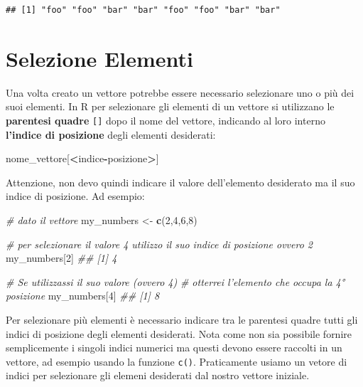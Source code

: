\documentclass[
]{book}
\newenvironment{Shaded}{\begin{snugshade}}{\end{snugshade}}
\newcommand{\CommentTok}[1]{\textcolor[rgb]{0.56,0.35,0.01}{\textit{#1}}}
\newcommand{\DecValTok}[1]{\textcolor[rgb]{0.00,0.00,0.81}{#1}}
\newcommand{\KeywordTok}[1]{\textcolor[rgb]{0.13,0.29,0.53}{\textbf{#1}}}
\newcommand{\NormalTok}[1]{#1}
\newcommand{\OperatorTok}[1]{\textcolor[rgb]{0.81,0.36,0.00}{\textbf{#1}}}
\newcommand{\StringTok}[1]{\textcolor[rgb]{0.31,0.60,0.02}{#1}}
\begin{document}
\begin{verbatim}
## [1] "foo" "foo" "bar" "bar" "foo" "foo" "bar" "bar"
\end{verbatim}

\hypertarget{selezione-elementi}{%
\section{Selezione Elementi}\label{selezione-elementi}}

Una volta creato un vettore potrebbe essere necessario selezionare uno o più dei suoi elementi. In R per selezionare gli elementi di un vettore si utilizzano le \textbf{parentesi quadre} \texttt{{[}{]}} dopo il nome del vettore, indicando al loro interno \textbf{l'indice di posizione} degli elementi desiderati:

\begin{Shaded}
\begin{Highlighting}[]
\NormalTok{nome_vettore[}\OperatorTok{<}\NormalTok{indice}\OperatorTok{-}\NormalTok{posizione}\OperatorTok{>}\NormalTok{]}
\end{Highlighting}
\end{Shaded}

Attenzione, non devo quindi indicare il valore dell'elemento desiderato ma il suo indice di posizione. Ad esempio:

\begin{Shaded}
\begin{Highlighting}[]
\CommentTok{# dato il vettore}
\NormalTok{my_numbers <-}\StringTok{ }\KeywordTok{c}\NormalTok{(}\DecValTok{2}\NormalTok{,}\DecValTok{4}\NormalTok{,}\DecValTok{6}\NormalTok{,}\DecValTok{8}\NormalTok{)}

\CommentTok{# per selezionare il valore 4 utilizzo il suo indice di posizione ovvero 2}
\NormalTok{my_numbers[}\DecValTok{2}\NormalTok{]}
\CommentTok{## [1] 4}

\CommentTok{# Se utilizzassi il suo valore (ovvero 4) }
\CommentTok{# otterrei l'elemento che occupa la 4° posizione}
\NormalTok{my_numbers[}\DecValTok{4}\NormalTok{]}
\CommentTok{## [1] 8}
\end{Highlighting}
\end{Shaded}

Per selezionare più elementi è necessario indicare tra le parentesi quadre tutti gli indici di posizione degli elementi desiderati. Nota come non sia possibile fornire semplicemente i singoli indici numerici ma questi devono essere raccolti in un vettore, ad esempio usando la funzione \texttt{c()}. Praticamente usiamo un vetore di indici per selezionare gli elemeni desiderati dal nostro vettore iniziale.
\end{document}
